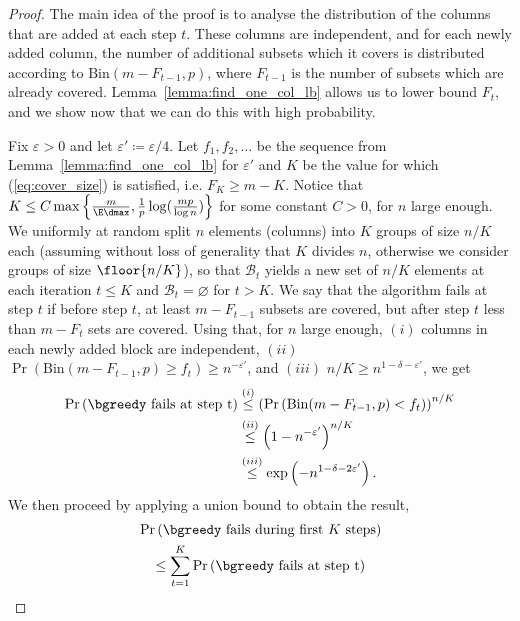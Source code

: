\begin{proof}
The main idea of the proof is to analyse the distribution of the columns that are added at each step \(t\). These columns are independent, and for each newly added column, the number of additional subsets which it covers is distributed according to \(\mathrm{Bin}(m - F_{t - 1}, p)\), where \(F_{t - 1}\) is the number of subsets which are already covered. Lemma~\ref{lemma:find_one_col_lb} allows us to lower bound \(F_t\), and we show now that we can do this with high probability.

\noindent
Fix \(\varepsilon > 0\) and let \(\varepsilon' \coloneqq \varepsilon / 4\). Let \(f_1, f_2, \ldots\) be the sequence from Lemma~\ref{lemma:find_one_col_lb} for \(\varepsilon'\) and \(K\) be the value for which (\ref{eq:cover_size}) is satisfied, i.e. \(F_{K} \geq m - K\). Notice that $K \leq C \max\left\{ \frac{m}{\E \dmax}, \frac{1}{p} \log(\frac{mp}{\log{n}}) \right\}$ for some constant $C > 0$, for \(n\) large enough. We uniformly at random split \(n\) elements (columns) into \(K\) groups of size \(n / K\) each (assuming without loss of generality that $K$ divides $n$, otherwise we consider groups of size \(\floor{n / K}\)), so that $\mathcal{B}_t$ yields a new set of $n/K$ elements at each iteration $t \leq K$ and \(\mathcal{B}_t = \varnothing\) for \(t > K\). We say that the algorithm fails at step \(t\) if before step \(t\), at least \(m - F_{t - 1}\) subsets are covered, but after step \(t\) less than \(m - F_t\) sets are covered. 
Using that, for \(n\) large enough, $(i)$ columns in each newly added block are independent, \((ii)\) \(\Pr \left(\mathrm{Bin}(m - F_{t - 1}, p) \geq f_t\right) \geq n^{-\varepsilon'}\), and \((iii)\) \(n / K \geq n^{1 - \delta - \varepsilon'}\), we get
\begin{align*}
\Pr\left(\text{\bgreedy fails at step t} \right) &\overset{(i)}\leq \left(\Pr\left(\mathrm{Bin}(m - F_{t - 1}, p) < f_t\right) \right)^{n / K} \\
&\overset{(ii)}{\leq} \left( 1 - n^{-\varepsilon'} \right)^{n / K} \\
& \overset{(iii)}{\leq} \exp\left( - n^{1 - \delta - 2\varepsilon'}\right).
\end{align*}
We then proceed by applying a union bound to obtain the result,
\begin{align*}
&\Pr \left(\bgreedy\text{ fails during first } K \text{ steps}\right) \\
&\quad \leq \sum_{t=1}^K \Pr\left( \bgreedy\text{ fails at step t}\right) \\

\end{align*}
\end{proof}
